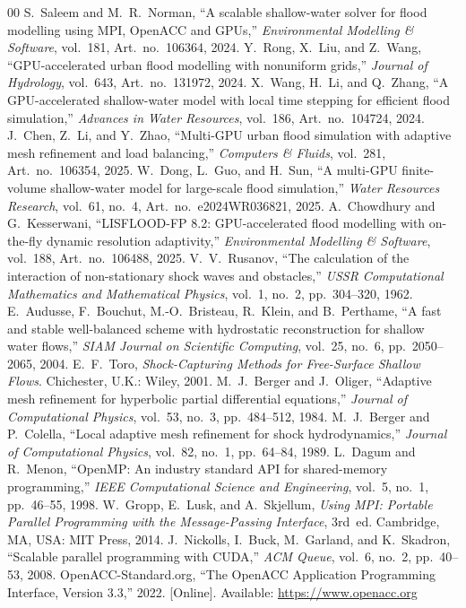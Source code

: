 \documentclass[conference]{IEEEtran}
\begin{document}
\begin{thebibliography}{00}
 S.~Saleem and M.~R.~Norman, ``A scalable shallow-water solver for flood modelling using MPI, OpenACC and GPUs,'' \textit{Environmental Modelling \& Software}, vol.~181, Art.~no.~106364, 2024.
 Y.~Rong, X.~Liu, and Z.~Wang, ``GPU-accelerated urban flood modelling with nonuniform grids,'' \textit{Journal of Hydrology}, vol.~643, Art.~no.~131972, 2024.
 X.~Wang, H.~Li, and Q.~Zhang, ``A GPU-accelerated shallow-water model with local time stepping for efficient flood simulation,'' \textit{Advances in Water Resources}, vol.~186, Art.~no.~104724, 2024.
 J.~Chen, Z.~Li, and Y.~Zhao, ``Multi-GPU urban flood simulation with adaptive mesh refinement and load balancing,'' \textit{Computers \& Fluids}, vol.~281, Art.~no.~106354, 2025.
 W.~Dong, L.~Guo, and H.~Sun, ``A multi-GPU finite-volume shallow-water model for large-scale flood simulation,'' \textit{Water Resources Research}, vol.~61, no.~4, Art.~no.~e2024WR036821, 2025.
 A.~Chowdhury and G.~Kesserwani, ``LISFLOOD-FP 8.2: GPU-accelerated flood modelling with on-the-fly dynamic resolution adaptivity,'' \textit{Environmental Modelling \& Software}, vol.~188, Art.~no.~106488, 2025.
 V.~V.~Rusanov, ``The calculation of the interaction of non-stationary shock waves and obstacles,'' \textit{USSR Computational Mathematics and Mathematical Physics}, vol.~1, no.~2, pp.~304--320, 1962.
 E.~Audusse, F.~Bouchut, M.-O.~Bristeau, R.~Klein, and B.~Perthame, ``A fast and stable well-balanced scheme with hydrostatic reconstruction for shallow water flows,'' \textit{SIAM Journal on Scientific Computing}, vol.~25, no.~6, pp.~2050--2065, 2004.
 E.~F.~Toro, \textit{Shock-Capturing Methods for Free-Surface Shallow Flows}. Chichester, U.K.: Wiley, 2001.
 M.~J.~Berger and J.~Oliger, ``Adaptive mesh refinement for hyperbolic partial differential equations,'' \textit{Journal of Computational Physics}, vol.~53, no.~3, pp.~484--512, 1984.
 M.~J.~Berger and P.~Colella, ``Local adaptive mesh refinement for shock hydrodynamics,'' \textit{Journal of Computational Physics}, vol.~82, no.~1, pp.~64--84, 1989.
 L.~Dagum and R.~Menon, ``OpenMP: An industry standard API for shared-memory programming,'' \textit{IEEE Computational Science and Engineering}, vol.~5, no.~1, pp.~46--55, 1998.
 W.~Gropp, E.~Lusk, and A.~Skjellum, \textit{Using MPI: Portable Parallel Programming with the Message-Passing Interface}, 3rd~ed. Cambridge, MA, USA: MIT Press, 2014.
 J.~Nickolls, I.~Buck, M.~Garland, and K.~Skadron, ``Scalable parallel programming with CUDA,'' \textit{ACM Queue}, vol.~6, no.~2, pp.~40--53, 2008.
 OpenACC-Standard.org, ``The OpenACC Application Programming Interface, Version 3.3,'' 2022. [Online]. Available: \url{https://www.openacc.org}
\end{thebibliography}
\end{document}
